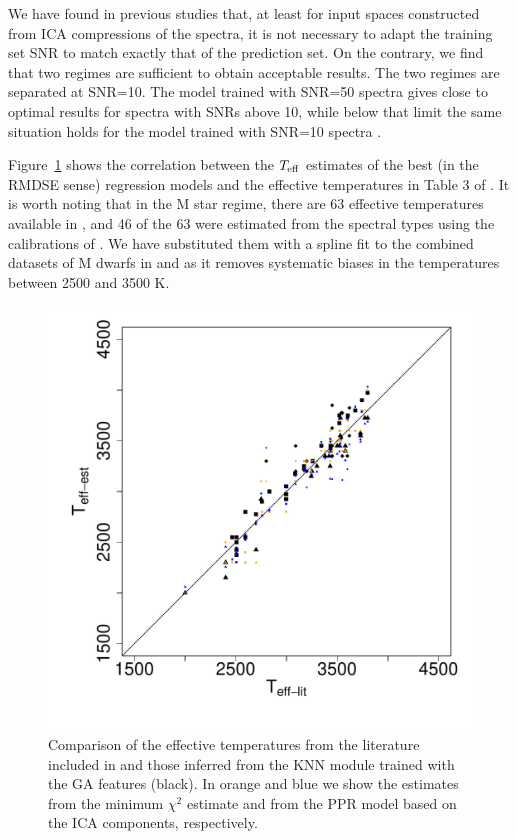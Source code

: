 We have found in previous studies that, at least for input spaces
constructed from ICA compressions of the spectra, it is not necessary
to adapt the training set SNR to match exactly that of the prediction
set. On the contrary, we find that two regimes are sufficient to
obtain acceptable results. The two regimes are separated at
SNR=10. The model trained with SNR=50 spectra gives close to optimal
results for spectra with SNRs above 10, while below that limit the
same situation holds for the model trained with SNR=10
spectra \cite{2017MNRAS.465.4556G}.

Figure~\ref{fig:irtf-teff} shows the correlation between the $T_{\rm
eff}$ estimates of the best (in the RMDSE sense) regression models and
the effective temperatures in Table 3 of \cite{cesetti}. It is worth
noting that in the M star regime, there are 63 effective temperatures
available in \cite{cesetti}, and 46 of the 63 were estimated from the
spectral types using the calibrations
of \cite{1996imsa.book.....O}. We have substituted them with a spline
fit to the combined datasets of M dwarfs in \cite{2013A&A...556A..15R}
and \cite{2012ApJ...757..112B} as it removes systematic biases in the
temperatures between 2500 and 3500 K.

\begin {figure}
 \centering
  \includegraphics[scale=0.4]{figs/irtf-teffs-literature}
  
  \caption{Comparison of the effective temperatures from the
  literature included in \protect\cite{cesetti} and those inferred from the
  KNN module trained with the GA features (black). In orange and blue
  we show the estimates from the minimum $\chi^2$ estimate and from
  the PPR model based on the ICA components, respectively.}

\label{fig:irtf-teff}
\end {figure}


